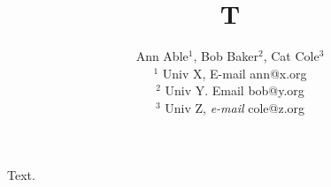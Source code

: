 \documentclass{article}
\begin{document}
\title{T}
\author{Ann Able$^1$, Bob Baker$^2$, Cat Cole$^3$ \\
$^1$ Univ X, E-mail ann@x.org \\
$^2$ Univ Y. Email bob@y.org \\
$^3$ Univ Z, \textit{e-mail} cole@z.org}
\maketitle
Text.
\end{document}

